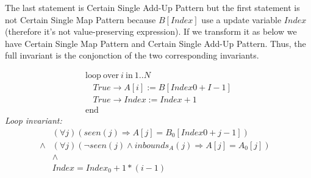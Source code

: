 \documentclass[a4paper,10pt]{article}
\newcommand{\KWloop}{\ensuremath{\mathrm{loop}~}}
\newcommand{\KWend}{\ensuremath{\mathrm{end}~}}
\newcommand{\KWover}{\ensuremath{\mathrm{over}~}}
\newcommand{\KWin}{\ensuremath{~\mathrm{in}~}}
\newcommand{\impl}{\ensuremath{\Longrightarrow}}
\newcommand{\inbounds}[2]{\ensuremath{\mathit{inbounds}_{#1}(#2)}\xspace}
\newcommand{\seen}[1]{\ensuremath{\mathit{seen}(#1)}\xspace}
\newcommand{\loopinvariant}{\noindent\textit{Loop invariant:}\xspace}
\begin{document}
The last statement is Certain Single Add-Up Pattern but the first statement is not Certain Single Map Pattern
because $B[Index]$ use a update variable $Index$ (therefore it's not value-preserving expression). 
If we transform it as below we have Certain Single Map Pattern and Certain Single Add-Up Pattern. 
Thus, the full invariant is the conjonction of the two corresponding invariants.

$$\begin{array}{l}
  \KWloop \KWover i \KWin 1 .. N \\
  ~~~~ True \rightarrow A[i]   := B[Index0 + I-1]\\
  ~~~~ True \rightarrow Index := Index + 1\\
  \KWend
\end{array}$$
%
\loopinvariant
%
\begin{eqnarray*}
&(\forall j)(\seen{j} \impl A[j] = B_0[Index0 + j-1]) \\
\land& (\forall j)(\neg \seen{j} \land \inbounds{A}{j} \impl A[j] = A_0[j])\\
&\land& \\
&Index = Index_0 + 1 * (i-1)&
\end{eqnarray*}



\end{document}
